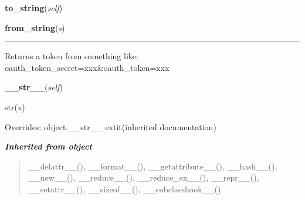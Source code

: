    \vspace{0.5ex}

\hspace{.8\funcindent}\begin{boxedminipage}{\funcwidth}

    \raggedright \textbf{to\_string}(\textit{self})

\setlength{\parskip}{2ex}
\setlength{\parskip}{1ex}
    \end{boxedminipage}

    \label{lib:oauth:OAuthToken:from_string}

    \vspace{0.5ex}

\hspace{.8\funcindent}\begin{boxedminipage}{\funcwidth}

    \raggedright \textbf{from\_string}(\textit{s})

    \vspace{-1.5ex}

    \rule{\textwidth}{0.5\fboxrule}
\setlength{\parskip}{2ex}
    Returns a token from something like: 
    oauth\_token\_secret=xxx\&oauth\_token=xxx

\setlength{\parskip}{1ex}
    \end{boxedminipage}

    \vspace{0.5ex}

\hspace{.8\funcindent}\begin{boxedminipage}{\funcwidth}

    \raggedright \textbf{\_\_str\_\_}(\textit{self})

\setlength{\parskip}{2ex}
    str(x)

\setlength{\parskip}{1ex}
      Overrides: object.\_\_str\_\_ 	extit{(inherited documentation)}

    \end{boxedminipage}


\large{\textbf{\textit{Inherited from object}}}

\begin{quote}
\_\_delattr\_\_(), \_\_format\_\_(), \_\_getattribute\_\_(), \_\_hash\_\_(), \_\_new\_\_(), \_\_reduce\_\_(), \_\_reduce\_ex\_\_(), \_\_repr\_\_(), \_\_setattr\_\_(), \_\_sizeof\_\_(), \_\_subclasshook\_\_()
\end{quote}

